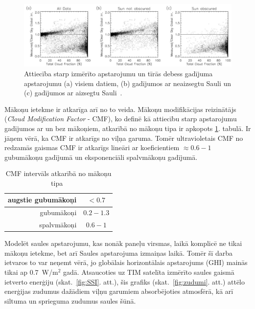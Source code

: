 \begin{figure}[h]
	\centering
	\includegraphics[width=\linewidth]{figures/misc/makoni_ietekme.jpg}
	\caption{Attiecība starp izmērīto apstarojumu un tīrās debess gadījuma apstarojumu (a) visiem datiem, (b) gadījumos ar neaizsegtu Sauli un (c) gadījumos ar aizsegtu Sauli~\cite{CloudCoverageImpactOnIrradiance}.}
	\label{fig:makoni_ietekme}
\end{figure}

Mākoņu ietekme ir atkarīga arī no to veida. Mākoņu modifikācijas reizinātājs (\textit{Cloud Modification Factor} - CMF), ko definē kā attiecību starp apstarojumu gadījumos ar un bez mākoņiem, atkarībā no mākoņu tipa ir apkopots \ref{tab:CMF}. tabulā. Ir jāņem vērā, ka CMF ir atkarīgs no viļņa garuma. Tomēr ultravioletais CMF no redzamās gaismas CMF ir atkarīgs lineāri ar koeficientiem $\approx0.6-1$ gubumākoņu gadījumā un eksponenciāli spalvmākoņu gadījumā.
\begin{table}[h]
	\caption{CMF intervāls atkarībā no mākoņu tipa~\cite{effectCloudsOnSurface}}
	\begin{center}
		\begin{tabular}{| r | c |}
			\hline
			augstie gubumākoņi & $<0.7$     \\ \hline
			gubumākoņi         & $0.2-1.3$ \\ \hline
			spalvmākoņi        & $0.6-1$    \\ \hline
		\end{tabular}
	\end{center}
	\label{tab:CMF}
\end{table}

Modelēt saules apstarojumu, kas nonāk paneļu virsmas, laikā komplicē ne tikai mākoņu ietekme, bet arī Saules apstarojuma izmaiņas laikā. Tomēr šī darba ietvaros to var neņemt vērā, jo globālais horizontālais apstarojums (GHI) mainās tikai ap 0.7~W/m$^2$ gadā. Atsaucoties uz TIM satelīta izmērīto saules gaismā ietverto enerģiju (skat.~\ref{fig:SSI}. att.), šis grafiks (skat.~\ref{fig:zudumi}. att.) attēlo enerģijas zudumus dažādiem viļņu garumiem absorbējoties atmosfērā, kā arī siltuma un sprieguma zudumus saules šūnā.

